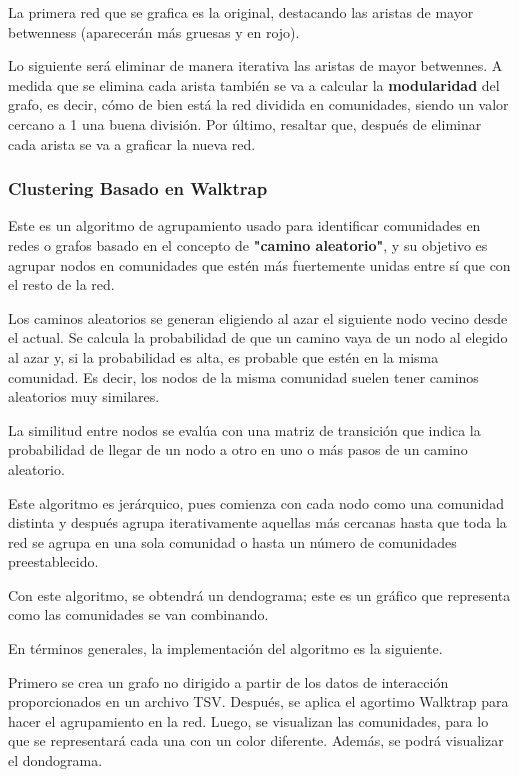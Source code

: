 La primera red que se grafica es la original, destacando las aristas de mayor betwenness (aparecerán más gruesas y en rojo).

Lo siguiente será eliminar de manera iterativa las aristas de mayor betwennes. A medida que se elimina cada arista también se va a calcular la \textbf{modularidad} del grafo, es decir, cómo de bien está la red dividida en comunidades, siendo un valor cercano a 1 una buena división. Por último, resaltar que, después de eliminar cada arista se va a graficar la nueva red.

\subsubsection{Clustering Basado en Walktrap}

Este es un algoritmo de agrupamiento usado para identificar comunidades en redes o grafos basado en el concepto de \textbf{"camino aleatorio"}, y su objetivo es agrupar nodos en comunidades que estén más fuertemente unidas entre sí que con el resto de la red.

Los caminos aleatorios se generan eligiendo al azar el siguiente nodo vecino desde el actual. Se calcula la probabilidad de que un camino vaya de un nodo al elegido al azar y, si la probabilidad es alta, es probable que estén en la misma comunidad. Es decir, los nodos de la misma comunidad suelen tener caminos aleatorios muy similares.

La similitud entre nodos se evalúa con una matriz de transición que indica la probabilidad de llegar de un nodo a otro en uno o más pasos de un camino aleatorio.

Este algoritmo es jerárquico, pues comienza con cada nodo como una comunidad distinta y después agrupa iterativamente aquellas más cercanas hasta que toda la red se agrupa en una sola comunidad o hasta un número de comunidades preestablecido. 

Con este algoritmo, se obtendrá un dendograma; este es un gráfico que representa como las comunidades se van combinando.

En términos generales, la implementación del algoritmo es la siguiente.

Primero se crea un grafo no dirigido a partir de los datos de interacción proporcionados en un archivo TSV. Después, se aplica el agortimo Walktrap para hacer el agrupamiento en la red. Luego, se visualizan las comunidades, para lo que se representará cada una con un color diferente. Además, se podrá visualizar el dondograma.


